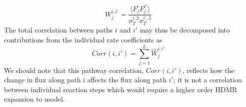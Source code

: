 \begin{equation}
\label{ch3:eqn21_W_i_j}
W_j^{i,i\prime} = \frac{\langle F_j^i F_j^{i\prime} \rangle}{\sigma_T^{i,2} \sigma_T^{i\prime,2}}
\end{equation}
The total correlation between paths $i$ and $i\prime$ may thus be
decomposed into contributions from the individual rate coefficients as
\begin{equation}
\label{ch3:eqn22_C_W_i_j}
Corr(i,i\prime) = \sum_{j=1}^{L}{ {\widehat{W}}_{j}^{i,i\prime} }
\end{equation}
We should note that this pathway correlation, $Corr(i,i\prime)$,
reflects how the change in flux along path i affects the flux along
path $i\prime$; it is not a correlation between individual reaction steps
which would require a higher order HDMR expansion to model.
\newline
